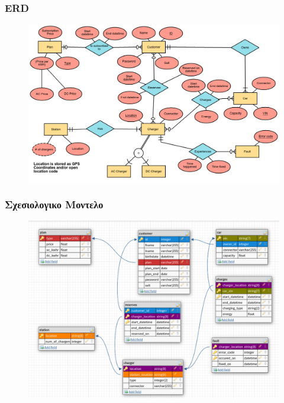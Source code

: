 \documentclass[10pt]{beamer}
\begin{document}
\begin{frame}
    \frametitle{ERD}

    \begin{adjustwidth*}{-3cm}{-3cm}
    \begin{figure}
        \centering
        \includegraphics[width=1.1\textwidth]{../img/Charging Stations.png}
    \end{figure}
    \end{adjustwidth*}

\end{frame}

\begin{frame}
    \frametitle{Σχεσιολογικο Μοντελο }

    \begin{adjustwidth*}{-3cm}{-3cm}
    \begin{figure}
        \centering
        \includegraphics[width=1.1\textwidth]{../img/DBDesigner.png}
    \end{figure}
    \end{adjustwidth*}

\end{frame}
\end{document}
